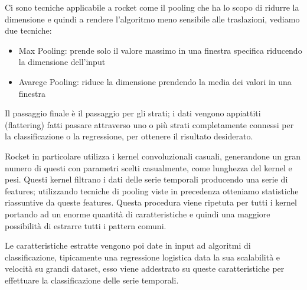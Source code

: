 Ci sono tecniche applicabile a rocket come il pooling che ha lo scopo di ridurre la dimensione e quindi a rendere l'algoritmo meno sensibile alle traslazioni, vediamo due tecniche:
\begin{itemize}
    \item Max Pooling: prende solo il valore massimo in una finestra specifica riducendo la dimensione dell'input
    \item Avarege Pooling: riduce la dimensione prendendo la media dei valori in una finestra
\end{itemize}

Il passaggio finale è il passaggio per gli strati; i dati vengono appiattiti (flattering) fatti passare attraverso uno o più strati completamente connessi per la classificazione o la regressione, per ottenere il risultato desiderato.

Rocket in particolare utilizza i kernel convoluzionali casuali, generandone un gran numero di questi con parametri scelti casualmente, come lunghezza del kernel e pesi.
Questi kernel filtrano i dati delle serie temporali producendo una serie di features; utilizzando tecniche di pooling viste in precedenza otteniamo statistiche riassuntive da queste features.
Questa procedura viene ripetuta per tutti i kernel portando ad un enorme quantità di caratteristiche e quindi una maggiore possibilità di estrarre tutti i pattern comuni.

Le caratteristiche estratte vengono poi date in input ad algoritmi di classificazione, tipicamente una regressione logistica data la sua scalabilità e velocità su grandi dataset, esso viene addestrato su queste caratteristiche per effettuare la classificazione delle serie temporali.

